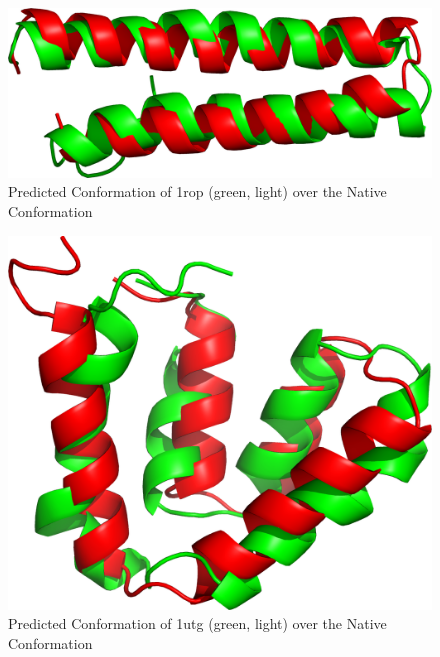 \begin{figure}[ht]
    \centering
    \includegraphics[width=0.9\linewidth]{Figuras/prots/1rop_render.png}
    \caption{Predicted Conformation of 1rop (green, light) over the Native Conformation}
    \label{fig:1rop-visual}
\end{figure}

\begin{figure}[ht]
    \centering
    \includegraphics[width=0.9\linewidth]{Figuras/prots/1utg_render.png}
    \caption{Predicted Conformation of 1utg (green, light) over the Native Conformation}
    \label{fig:1utg-visual}
\end{figure}

